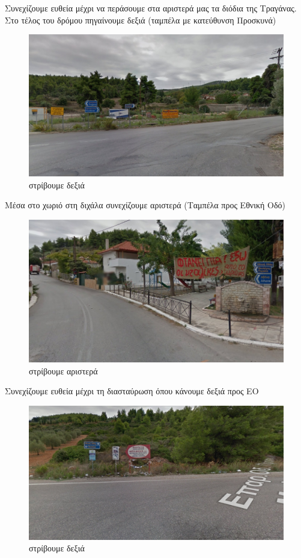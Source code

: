 Συνεχίζουμε ευθεία μέχρι να περάσουμε στα αριστερά μας τα διόδια της Τραγάνας. Στο τέλος του δρόμου πηγαίνουμε δεξιά (ταμπέλα με κατεύθυνση Προσκυνά)
\begin{figure}[H]
\includegraphics[width=\textwidth]{images/lamia-athina/tragana/tragana_011.jpg} 
\caption{στρίβουμε δεξιά}
\end{figure}
Μέσα στο χωριό στη διχάλα συνεχίζουμε αριστερά (Ταμπέλα προς Εθνική Οδό)
\begin{figure}[H]
\includegraphics[width=\textwidth]{images/lamia-athina/tragana/tragana_012.jpg} 
\caption{στρίβουμε αριστερά}
\end{figure}
Συνεχίζουμε ευθεία μέχρι τη διασταύρωση όπου κάνουμε δεξιά προς ΕΟ
\begin{figure}[H]
\includegraphics[width=\textwidth]{images/lamia-athina/tragana/tragana_013.jpg} 
\caption{στρίβουμε δεξιά}
\end{figure}
